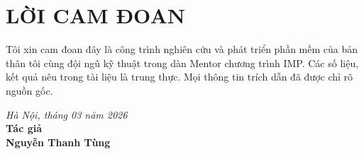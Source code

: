 \chapter*{LỜI CAM ĐOAN}
Tôi xin cam đoan đây là công trình nghiên cứu và phát triển phần mềm của bản thân tôi cùng đội ngũ kỹ thuật trong dàn Mentor chương trình IMP. Các số liệu, kết quả nêu trong tài liệu là trung thực. Mọi thông tin trích dẫn đã được chỉ rõ nguồn gốc.

\vspace{1.5cm}
\begin{flushright}
  \textit{Hà Nội, tháng 03 năm 2026} \\
  \textbf{Tác giả} \\
  \vspace{2cm}
  \textbf{Nguyễn Thanh Tùng}
\end{flushright}

